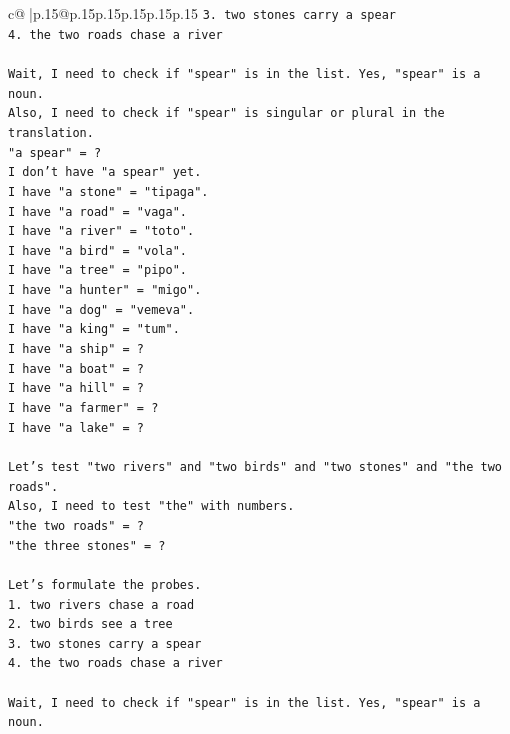 \documentclass{article}
\begin{document}
{\begin{supertabular}{c@{$\;$}|p{.15\linewidth}@{}p{.15\linewidth}p{.15\linewidth}p{.15\linewidth}p{.15\linewidth}p{.15\linewidth}}
{{{\texttt{3. two stones carry a spear} \\
\texttt{4. the two roads chase a river} \\
\\ 
\texttt{Wait, I need to check if "spear" is in the list. Yes, "spear" is a noun.} \\
\texttt{Also, I need to check if "spear" is singular or plural in the translation.} \\
\texttt{"a spear" = ?} \\
\texttt{I don't have "a spear" yet.} \\
\texttt{I have "a stone" = "tipaga".} \\
\texttt{I have "a road" = "vaga".} \\
\texttt{I have "a river" = "toto".} \\
\texttt{I have "a bird" = "vola".} \\
\texttt{I have "a tree" = "pipo".} \\
\texttt{I have "a hunter" = "migo".} \\
\texttt{I have "a dog" = "vemeva".} \\
\texttt{I have "a king" = "tum".} \\
\texttt{I have "a ship" = ?} \\
\texttt{I have "a boat" = ?} \\
\texttt{I have "a hill" = ?} \\
\texttt{I have "a farmer" = ?} \\
\texttt{I have "a lake" = ?} \\
\\ 
\texttt{Let's test "two rivers" and "two birds" and "two stones" and "the two roads".} \\
\texttt{Also, I need to test "the" with numbers.} \\
\texttt{"the two roads" = ?} \\
\texttt{"the three stones" = ?} \\
\\ 
\texttt{Let's formulate the probes.} \\
\texttt{1. two rivers chase a road} \\
\texttt{2. two birds see a tree} \\
\texttt{3. two stones carry a spear} \\
\texttt{4. the two roads chase a river} \\
\\ 
\texttt{Wait, I need to check if "spear" is in the list. Yes, "spear" is a noun.} \\
}}}
\end{supertabular}}
\end{document}
